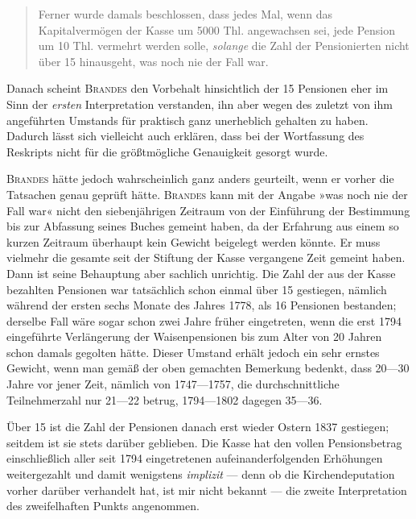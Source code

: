 \begin{quote}
Ferner wurde damals beschlossen, dass jedes Mal, wenn das Kapitalvermögen der Kasse um 5000 Thl. angewachsen sei, jede Pension um 10 Thl. vermehrt werden solle, \textit{solange} die Zahl der Pensionierten nicht über 15 hinausgeht, was noch nie der Fall war.
\end{quote}
\noindent\hspace*{\parindent}Danach scheint \textsc{Brandes} den Vorbehalt hinsichtlich der 15 Pensionen eher im Sinn der \textit{ersten} Interpretation verstanden, ihn aber wegen des zuletzt von ihm angeführten Umstands für praktisch ganz unerheblich gehalten zu haben. Dadurch lässt sich vielleicht auch erklären, dass bei der Wortfassung des Reskripts nicht für die größtmögliche Genauigkeit gesorgt wurde.

\textsc{Brandes} hätte jedoch wahrscheinlich ganz anders geurteilt, wenn er vorher die Tatsachen genau geprüft hätte. \textsc{Brandes} kann mit der Angabe »was noch nie der Fall war« nicht den siebenjährigen Zeitraum von der Einführung der Bestimmung bis zur Abfassung seines Buches gemeint haben, da der Erfahrung aus einem so kurzen Zeitraum überhaupt kein Gewicht beigelegt werden könnte. Er muss vielmehr die gesamte seit der Stiftung der Kasse vergangene Zeit gemeint haben. Dann ist seine Behauptung aber sachlich unrichtig. Die Zahl der aus der Kasse bezahlten Pensionen war tatsächlich schon einmal über 15 gestiegen, nämlich während der ersten sechs Monate des Jahres 1778, als 16 Pensionen bestanden; derselbe Fall wäre sogar schon
zwei Jahre früher eingetreten, wenn die erst 1794 eingeführte Verlängerung der Waisenpensionen bis zum Alter von 20 Jahren schon damals gegolten hätte. Dieser Umstand erhält jedoch ein sehr ernstes Gewicht, wenn man gemäß der oben gemachten Bemerkung bedenkt, dass 20—30 Jahre vor jener Zeit, nämlich von 1747—1757, die durchschnittliche Teilnehmerzahl nur 21—22 betrug, 1794—1802 dagegen 35—36.

Über 15 ist die Zahl der Pensionen danach erst wieder Ostern 1837 gestiegen; seitdem ist sie stets darüber geblieben. Die Kasse hat den vollen Pensionsbetrag einschließlich aller seit 1794 eingetretenen aufeinanderfolgenden Erhöhungen weitergezahlt und damit wenigstens \textit{implizit} — denn ob die Kirchendeputation vorher darüber verhandelt hat, ist mir nicht bekannt — die zweite Interpretation des zweifelhaften Punkts angenommen.

